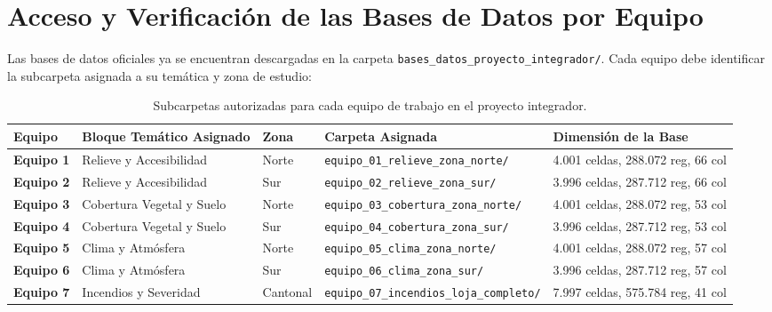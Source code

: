 \documentclass[11pt,a4paper]{article}
\begin{document}
\section{Acceso y Verificación de las Bases de Datos por Equipo}

Las bases de datos oficiales ya se encuentran descargadas en la carpeta \texttt{bases\_datos\_proyecto\_integrador/}. Cada equipo debe identificar la subcarpeta asignada a su temática y zona de estudio:

\begin{table}[h!]
\centering
\scriptsize
\renewcommand{\arraystretch}{1.15}
\begin{tabularx}{\textwidth}{C{1.2cm} L{3.5cm} C{2.0cm} Y L{4.5cm}}
\toprule
\textbf{Equipo} & \textbf{Bloque Temático Asignado} & \textbf{Zona} & \textbf{Carpeta Asignada} & \textbf{Dimensión de la Base} \\
\midrule
\textbf{Equipo 1} & Relieve y Accesibilidad & Norte & \texttt{equipo\_01\_relieve\_}\newline\texttt{zona\_norte/} & 4.001 celdas, 288.072 reg, 66 col \\
\textbf{Equipo 2} & Relieve y Accesibilidad & Sur & \texttt{equipo\_02\_relieve\_}\newline\texttt{zona\_sur/} & 3.996 celdas, 287.712 reg, 66 col \\
\textbf{Equipo 3} & Cobertura Vegetal y Suelo & Norte & \texttt{equipo\_03\_cobertura\_}\newline\texttt{zona\_norte/} & 4.001 celdas, 288.072 reg, 53 col \\
\textbf{Equipo 4} & Cobertura Vegetal y Suelo & Sur & \texttt{equipo\_04\_cobertura\_}\newline\texttt{zona\_sur/} & 3.996 celdas, 287.712 reg, 53 col \\
\textbf{Equipo 5} & Clima y Atmósfera & Norte & \texttt{equipo\_05\_clima\_}\newline\texttt{zona\_norte/} & 4.001 celdas, 288.072 reg, 57 col \\
\textbf{Equipo 6} & Clima y Atmósfera & Sur & \texttt{equipo\_06\_clima\_}\newline\texttt{zona\_sur/} & 3.996 celdas, 287.712 reg, 57 col \\
\textbf{Equipo 7} & Incendios y Severidad & Cantonal & \texttt{equipo\_07\_incendios\_}\newline\texttt{loja\_completo/} & 7.997 celdas, 575.784 reg, 41 col \\
\bottomrule
\end{tabularx}
\caption{Subcarpetas autorizadas para cada equipo de trabajo en el proyecto integrador.}
\label{tab:equipos_carpetas}
\end{table}
\end{document}
